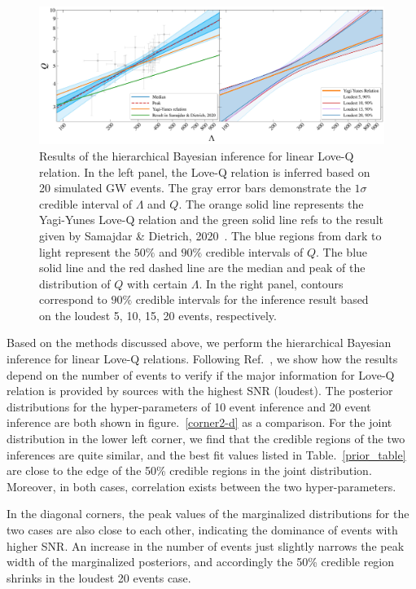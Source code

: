 \documentclass[a4paper,11pt]{article}
\begin{document}
\begin{figure}
\centering
\includegraphics[width=\textwidth]{hierarchical_results_AP4_2d.pdf}
    \caption{Results of the hierarchical Bayesian inference for linear Love-Q relation. In the left panel, the Love-Q relation is inferred based on 20 simulated GW events. The gray error bars demonstrate the $1\sigma$ credible interval of $\Lambda$ and $Q$. The orange solid line represents the Yagi-Yunes Love-Q relation and the green solid line refs to the result given by Samajdar \& Dietrich, 2020~\cite{Samajdar:2020xrd}. The blue regions from dark to light represent the $50\%$ and $90\%$ credible intervals of $Q$. The blue solid line and the red dashed line are the median and peak of the distribution of $Q$ with certain $\Lambda$. In the right panel, contours correspond to $90\%$ credible intervals for the inference result based on the loudest 5, 10, 15, 20 events, respectively.
    \label{2-d_Love_Q}}
\end{figure}

Based on the methods discussed above, we perform the hierarchical Bayesian inference for linear Love-Q relations. Following Ref.~\cite{Lackey:2014fwa}, we show how the results depend on the number of events to verify if the major information for Love-Q relation is provided by sources with the highest SNR (loudest). The posterior distributions for the hyper-parameters of 10 event inference and 20 event inference are both shown in figure.~\ref{corner2-d} as a comparison. For the joint distribution in the lower left corner, we find that the credible regions of the two inferences are quite similar, and the best fit values listed in Table.~\ref{prior_table} are close to the edge of the 50\% credible regions in the joint distribution. Moreover, in both cases, correlation exists between the two hyper-parameters. 

In the diagonal corners, the peak values of the marginalized distributions for the two cases are also close to each other, indicating the dominance of events with higher SNR. An increase in the number of events just slightly narrows the peak width of the marginalized posteriors, and accordingly the 50\% credible region shrinks in the loudest 20 events case. 
\end{document}
